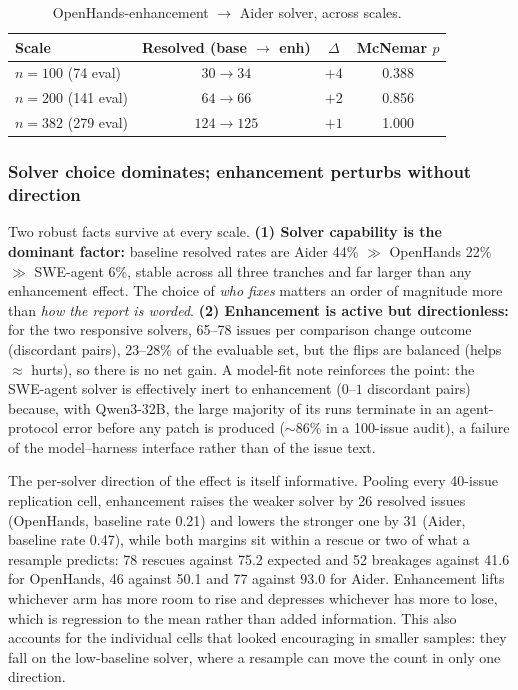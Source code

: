 \documentclass[journal]{IEEEtran}
\begin{document}
\begin{table}[t]
\centering
\caption{OpenHands-enhancement $\rightarrow$ Aider solver, across scales.}
\label{tab:scale}
\begin{tabular}{@{}lccc@{}}
\toprule
Scale & Resolved (base $\rightarrow$ enh) & $\Delta$ & McNemar $p$ \\
\midrule
$n=100$ (74 eval)  & $30 \rightarrow 34$ & $+4$ & 0.388 \\
$n=200$ (141 eval) & $64 \rightarrow 66$ & $+2$ & 0.856 \\
$n=382$ (279 eval) & $124 \rightarrow 125$ & $+1$ & 1.000 \\
\bottomrule
\end{tabular}
\end{table}

\subsubsection{Solver choice dominates; enhancement perturbs without direction}
\label{sec:rq1-solver}
Two robust facts survive at every scale. \textbf{(1) Solver capability is the dominant factor:} baseline resolved rates are Aider 44\% $\gg$ OpenHands 22\% $\gg$ SWE-agent 6\%, stable across all three tranches and far larger than any enhancement effect. The choice of \emph{who fixes} matters an order of magnitude more than \emph{how the report is worded}. \textbf{(2) Enhancement is active but directionless:} for the two responsive solvers, 65--78 issues per comparison change outcome (discordant pairs), 23--28\% of the evaluable set, but the flips are balanced (helps $\approx$ hurts), so there is no net gain. A model-fit note reinforces the point: the SWE-agent solver is effectively inert to enhancement ($0$--$1$ discordant pairs) because, with Qwen3-32B, the large majority of its runs terminate in an agent-protocol error before any patch is produced ($\sim$86\% in a 100-issue audit), a failure of the model--harness interface rather than of the issue text.

The per-solver direction of the effect is itself informative. Pooling every 40-issue replication cell, enhancement raises the weaker solver by 26 resolved issues (OpenHands, baseline rate 0.21) and lowers the stronger one by 31 (Aider, baseline rate 0.47), while both margins sit within a rescue or two of what a resample predicts: 78 rescues against 75.2 expected and 52 breakages against 41.6 for OpenHands, 46 against 50.1 and 77 against 93.0 for Aider. Enhancement lifts whichever arm has more room to rise and depresses whichever has more to lose, which is regression to the mean rather than added information. This also accounts for the individual cells that looked encouraging in smaller samples: they fall on the low-baseline solver, where a resample can move the count in only one direction.
\end{document}
